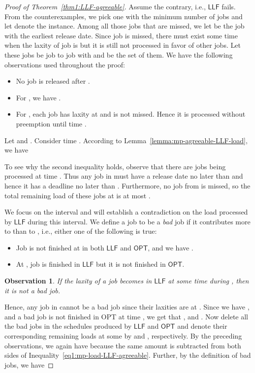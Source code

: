 \documentclass[letterpaper,11pt]{article}
\newtheorem{observation}{Observation}
\newcommand{\LLF}{\ensuremath{\mathsf{LLF}}\xspace}
\newcommand{\OPT}{\ensuremath{\mathsf{OPT}}\xspace}
\begin{document}
\begin{proof}[Proof of Theorem~\ref{thm1:LLF-agreeable}] Assume the contrary, i.e., \LLF fails. From the counterexamples, we pick one with the minimum number of jobs and let  denote the instance. Among all those jobs that are missed, we let  be the job with the earliest release date. Since job  is missed, there must exist some time  when the laxity of job  is  but it is still not processed in favor of  other jobs. Let these jobs be job  to job  with  and  be the set of them. We have the following observations used throughout the proof:
\begin{itemize}
\item No job is released after .
\item For , we have .
\item For , each job  has  laxity at  and is not missed. Hence it is processed without preemption until time .
\end{itemize}
  
Let  and . 
Consider time . According to Lemma~\ref{lemma:mp-agreeable-LLF-load}, we have
 

To see why the second inequality holds, observe that there are  jobs being processed at time . Thus any job in  must have a release date no later than  and hence it has a deadline no later than . Furthermore, no job from  is missed, so the total remaining load of these jobs at  is at most .

We focus on the interval  and will establish a contradiction on the load processed by \LLF during this interval. We define a job  to be a {\em bad} job if it contributes more to  than to , i.e., either one of the following is true:
\begin{itemize}
\item Job  is not finished at  in both \LLF and \OPT, and we have .
\item At , job  is finished in \LLF but it is not finished in \OPT.
\end{itemize}

\begin{observation}
If the laxity of a job becomes  in \LLF at some time during , then it is not a bad job.
\end{observation}

Hence, any job in  cannot be a bad job since their laxities are  at . Since we have , and a bad job  is not finished in OPT at time , we get that , and . Now delete all the bad jobs in the schedules produced by \LLF and \OPT and denote their corresponding remaining loads at some  by  and , respectively. By the preceding observations, we again have  because the same amount is subtracted from both sides of Inequality~\ref{eq1:mp-load-LLF-agreeable}. Further, by the definition of bad jobs, we have 


\end{proof}
\end{document}
